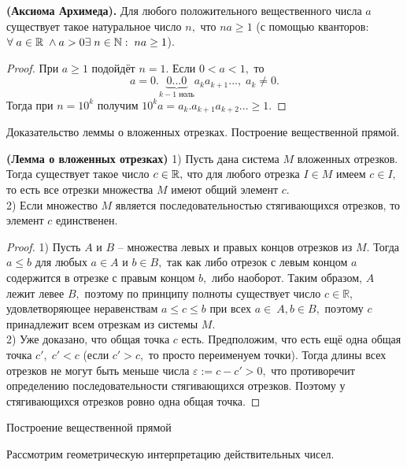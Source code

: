 \begin{proposition} \textbf{(Аксиома Архимеда).}
    Для любого положительного вещественного числа
    $a$ существует такое натуральное число $n,$ что
    $na\geq1$ (с помощью кванторов: $\forall\;a\in\mathbb{R}\;
        \wedge a>0\exists\;n\in\mathbb{N}:\;na\geq1$).
\end{proposition}
\begin{proof}
    При $a\geq1$ подойдёт $n=1.$ Если $0<a<1,$
    то
    $$
        a=0.\underbrace{0...0}\limits_{k-1 \textrm{ ноль}}
        a_ka_{k+1}...,\;a_k\neq0.
    $$
    Тогда при $n=10^k$ получим
    $10^ka=a_k.a_{k+1}a_{k+2}...\geq1.$
\end{proof}

\newpage
\begin{problem}
Доказательство леммы о вложенных отрезках. Построение вещественной прямой.
\end{problem}

\begin{theorem} \textbf{\textrm{(Лемма о вложенных отрезках)}}
    1) Пусть дана система $M$ вложенных отрезков. Тогда
    существует такое число $c\in\mathbb{R},$ что для любого отрезка
    $I\in M$ имеем $c\in I,$ то есть все отрезки
    множества $M$ имеют общий элемент $c$.\\
    2) Если множество $M$
    является последовательностью стягивающихся отрезков,
    то элемент $c$ единственен.
\end{theorem}
\begin{proof}
    1) Пусть $A$ и $B$ -- множества левых и правых
    концов отрезков из $M.$ Тогда $a\leq b$ для любых
    $a\in A$ и $b\in B,$ так как либо
    отрезок с левым концом $a$ содержится
    в отрезке с правым концом $b,$ либо наоборот.
    Таким образом, $A$ лежит левее $B,$
    поэтому по принципу полноты существует число
    $c\in\mathbb{R},$ удовлетворяющее
    неравенствам $a\leq c\leq b$
    при всех $a\in\ A, b\in B,$ поэтому
    $c$ принадлежит всем отрезкам из системы $M.$\\
    2) Уже доказано, что
    общая точка $c$ есть. Предположим, что есть
    ещё одна общая точка $c',\;c'< c$
    (если $c'>c,$ то просто переименуем точки).
    Тогда длины всех отрезков не могут
    быть меньше числа $\varepsilon:=c-c'>0,$ что
    противоречит определению последовательности
    стягивающихся отрезков. Поэтому у стягивающихся
    отрезков ровно одна общая точка.
\end{proof}

\begin{center}
    \textsf{Построение вещественной прямой}
\end{center}
Рассмотрим геометрическую интерпретацию
действительных чисел.

